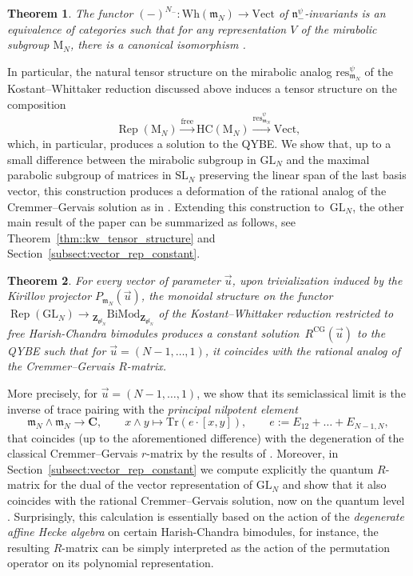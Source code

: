 \documentclass[10pt,a4paper]{article}
\numberwithin{equation}{section}
\newtheorem{thmx}{Theorem}
\newcommand{\CG}{\mathrm{CG}}
\newcommand{\Tr}{\mathrm{Tr}}
\newcommand{\C}{\mathbf{C}}
\newcommand{\Z}{\mathbf{Z}}
\newcommand{\GL}{\mathrm{GL}}
\newcommand{\n}{\mathfrak{n}}
\newcommand{\m}{\mathfrak{m}}
\newcommand{\BiMod}[2]{{}_{#1}\mathrm{BiMod}_{#2}}
\newcommand{\free}{\mathrm{free}}
\DeclareMathOperator{\Rep}{Rep}
\newcommand{\res}{\mathrm{res}}
\newcommand{\Vect}{\mathrm{Vect}}
\newcommand{\gl}{\mathfrak{gl}}
\begin{document}
	\begin{thmx}
		The functor $(-)^{N_-} \colon \mathrm{Wh}(\m_N) \rightarrow \Vect$ of $\n_-^{\psi}$-invariants is an equivalence of categories such that for any representation $V$ of the mirabolic subgroup $\mathrm{M}_N$, there is a canonical isomorphism
	\smash{$
		\bigl(\n_-^{\psi} \backslash V \otimes \mathrm{U}(\m_N)\bigr)^{N_-} \cong V$}.
	\end{thmx}
	
	In particular, the natural tensor structure on the mirabolic analog $\res_{\m_N}^{\psi}$ of the Kostant--Whittaker reduction discussed above induces a tensor structure on the composition
	\[
	\Rep(\mathrm{M}_N) \xrightarrow{\free} \mathrm{HC}(\mathrm{M}_N) \xrightarrow{\res_{\m_N}^{\psi}} \Vect,
	\]
	which, in particular, produces a solution to the QYBE. We show that, up to a small difference between the mirabolic subgroup in $\GL_N$ and the maximal parabolic subgroup of matrices in $\mathrm{SL}_N$ preserving the linear span of the last basis vector, this construction produces a deformation of the rational analog of the Cremmer--Gervais solution as in \cite{EndelmanHodges}. Extending this construction to~$\GL_N$, the other main result of the paper can be summarized as follows, see Theorem~\ref{thm::kw_tensor_structure} and Section~\ref{subsect:vector_rep_constant}.
	
	\begin{thmx}
		For every vector of parameter $\vec{u}$, upon trivialization induced by the Kirillov projector $P_{\m_N}(\vec{u})$, the monoidal structure on the functor $\Rep(\GL_N) \rightarrow \BiMod{\Z_{\gl_N}}{\Z_{\gl_N}}$ of the Kostant--Whittaker reduction restricted to free Harish-Chandra bimodules produces a constant solution~$R^{\CG}(\vec{u})$ to the QYBE such that for $\vec{u} = (N-1,\dots,1)$, it coincides with the rational analog of the Cremmer--Gervais $R$-matrix.
	\end{thmx}
	
	More precisely, for $\vec{u} = (N-1,\dots,1)$, we show that its semiclassical limit is the inverse of trace pairing with the \emph{principal nilpotent element}
	\[
	\m_N \wedge \m_N \rightarrow \C, \qquad x \wedge y \mapsto \Tr(e\cdot[x,y]), \qquad e := E_{12} + \dots + E_{N-1,N},
	\]
	that coincides (up to the aforementioned difference) with the degeneration of the classical Cremmer--Gervais $r$-matrix by the results of \cite{GerstenhaberGiaquinto}. Moreover, in Section~\ref{subsect:vector_rep_constant} we compute explicitly the quantum $R$-matrix for the dual of the vector representation of $\GL_N$ and show that it also coincides with the rational Cremmer--Gervais solution, now on the quantum level \cite{EndelmanHodges}. Surprisingly, this calculation is essentially based on the action of the \emph{degenerate affine Hecke algebra} on certain Harish-Chandra bimodules, for instance, the resulting $R$-matrix can be simply interpreted as the action of the permutation operator on its polynomial representation.
	
\end{document}
